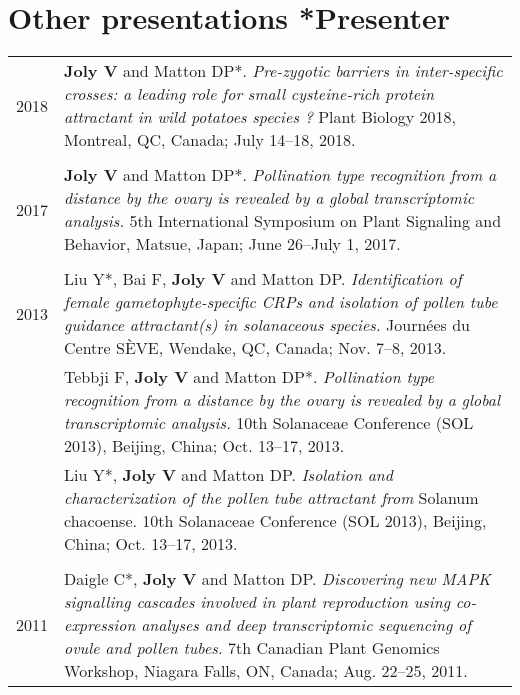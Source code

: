 \documentclass[letterpaper,12pt]{article}
\begin{document}
\vspace{6mm}

\section[Other presentations]{Other presentations \hfill \small{*Presenter}}

\begin{tabularx}{\textwidth}{@{}r|X@{}}

2018
& \textbf{Joly V} and Matton DP*.
  \emph{Pre-zygotic barriers in inter-specific crosses: a leading role for small
  cysteine-rich protein attractant in wild potatoes species ?}
  Plant Biology 2018, Montreal, QC, Canada;
  July 14–18, 2018.
  \\

\multicolumn{2}{c}{} \\

2017
& \textbf{Joly V} and Matton DP*.
  \emph{Pollination type recognition from a distance by the ovary is revealed
  by a global transcriptomic analysis.}
  5th International Symposium on Plant Signaling and Behavior, Matsue, Japan;
  June 26–July 1, 2017.
  \\

\multicolumn{2}{c}{} \\

2013
& Liu Y*, Bai F, \textbf{Joly V} and Matton DP.
  \emph{Identification of female gametophyte-specific CRPs and isolation of
  pollen tube guidance attractant(s) in solanaceous species.}
  Journées du Centre SÈVE, Wendake, QC, Canada;
  Nov. 7–8, 2013.
  \vspace{1.5mm}
  \\

& Tebbji F, \textbf{Joly V} and Matton DP*. \emph{Pollination type recognition
  from a distance by the ovary is revealed by a global transcriptomic analysis.}
  10th Solanaceae Conference (SOL 2013), Beijing, China;
  Oct. 13–17, 2013.
  \vspace{1.5mm}
  \\

& Liu Y*, \textbf{Joly V} and Matton DP.
  \emph{Isolation and characterization of the pollen tube attractant from}
  Solanum chacoense. 10th Solanaceae Conference (SOL 2013), Beijing, China;
  Oct. 13–17, 2013.
  \\

\multicolumn{2}{c}{} \\

2011
& Daigle C*, \textbf{Joly V} and Matton DP.
  \emph{Discovering new MAPK signalling cascades involved in plant reproduction
  using co-expression analyses and deep transcriptomic sequencing of ovule
  and pollen tubes.}
  7th Canadian Plant Genomics Workshop, Niagara Falls, ON, Canada;
  Aug. 22–25, 2011.
  \\

\end{tabularx}
\end{document}
